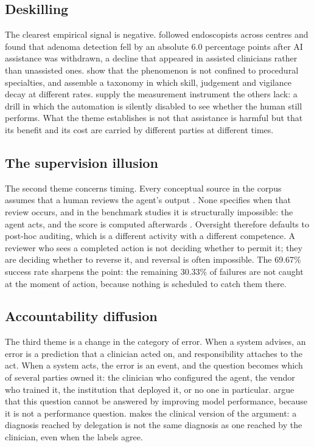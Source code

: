 \subsection{Deskilling}
The clearest empirical signal is negative. \citet{budzyn2025deskilling} followed endoscopists across centres and found that adenoma detection fell by an absolute 6.0 percentage points after AI assistance was withdrawn, a decline that appeared in assisted clinicians rather than unassisted ones. \citet{natali2025deskilling} show that the phenomenon is not confined to procedural specialties, and assemble a taxonomy in which skill, judgement and vigilance decay at different rates. \citet{hunter2024reliance} supply the measurement instrument the others lack: a drill in which the automation is silently disabled to see whether the human still performs. What the theme establishes is not that assistance is harmful but that its benefit and its cost are carried by different parties at different times.

\subsection{The supervision illusion}
The second theme concerns timing. Every conceptual source in the corpus assumes that a human reviews the agent's output \citep{habli2020accountability,abdulnour2025education,ong2026flight}. None specifies when that review occurs, and in the benchmark studies it is structurally impossible: the agent acts, and the score is computed afterwards \citep{jiang2025medagentbench}. Oversight therefore defaults to post-hoc auditing, which is a different activity with a different competence. A reviewer who sees a completed action is not deciding whether to permit it; they are deciding whether to reverse it, and reversal is often impossible. The 69.67\% success rate sharpens the point: the remaining 30.33\% of failures are not caught at the moment of action, because nothing is scheduled to catch them there.

\subsection{Accountability diffusion}
The third theme is a change in the category of error. When a system advises, an error is a prediction that a clinician acted on, and responsibility attaches to the act. When a system acts, the error is an event, and the question becomes which of several parties owned it: the clinician who configured the agent, the vendor who trained it, the institution that deployed it, or no one in particular. \citet{habli2020accountability} argue that this question cannot be answered by improving model performance, because it is not a performance question. \citet{clayton2025clinicians} makes the clinical version of the argument: a diagnosis reached by delegation is not the same diagnosis as one reached by the clinician, even when the labels agree.

